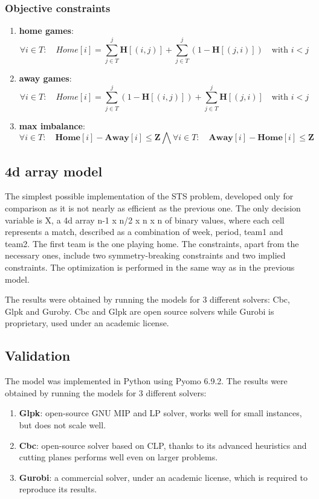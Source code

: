 \subsubsection*{Objective constraints}
\begin{enumerate}
    \item \textbf{home games}: 
\[\forall i \in T: \quad Home[i] = \sum_{j \in T}^{j} \textbf{H}[(i,j)] + \sum_{j \in T}^{j} (1- \textbf{H}[(j,i)]) \quad \text{with $i < j$}\]
    \item \textbf{away games}: 
\[\forall i \in T: \quad Home[i] = \sum_{j \in T}^{j} (1- \textbf{H}[(i,j)]) + \sum_{j \in T}^{j} \textbf{H}[(j,i)] \quad \text{with $i < j$}\]
    \item \textbf{max imbalance}:
\[\forall i \in T: \quad  \textbf{Home}[i] - \textbf{Away}[i] \leq \textbf{Z} \bigwedge
\forall i \in T: \quad  \textbf{Away}[i] - \textbf{Home}[i] \leq \textbf{Z} \]

\end{enumerate}

\subsection{4d array model}
The simplest possible implementation of the STS problem, developed only for comparison as it is not nearly as efficient as the previous one.
The only decision variable is X, a 4d array n-1 x n/2 x n x n of binary values, where each cell represents a match, described as a combination of week, period, team1 and team2. The first team is the one playing home.
The constraints, apart from the necessary ones, include two symmetry-breaking constraints and two implied constraints.
The optimization is performed in the same way as in the previous model.

The results were obtained by running the models for 3 different solvers: Cbc, Glpk and Guroby. Cbc and Glpk are open source solvers while Gurobi is proprietary, used under an academic license.

\subsection{Validation}
The model was implemented in Python using Pyomo 6.9.2. 
The results were obtained by running the models for 3 different solvers:
\begin{enumerate}
    \item \textbf{Glpk}: open-source GNU MIP and LP solver, works well for small instances, but does not scale well.
    \item \textbf{Cbc}: open-source solver based on CLP, thanks to its advanced heuristics and cutting planes performs well even on larger problems.
    \item \textbf{Gurobi}: a commercial solver, under an academic license, which is required to reproduce its results.
\end{enumerate}

